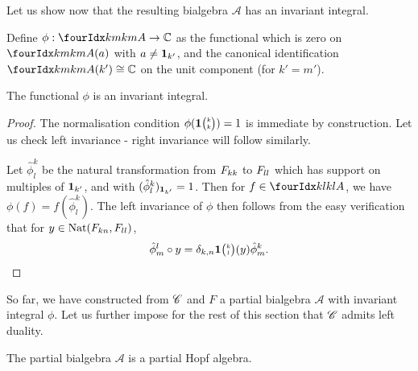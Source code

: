 Let us show now that the resulting bialgebra $\mathscr{A}$ has an invariant integral.

\begin{Def} Define $\phi: \Gr{A}{k}{k}{m}{m} \rightarrow \C$ as the functional which is zero on $\Gr{A}{k}{k}{m}{m}(a)$ with $a\neq \mathbf{1}_{k'}$, and the canonical identification $\Gr{A}{k}{k}{m}{m}(k')\cong \C$ on the unit component (for $k'=m'$).
\end{Def}

\begin{Lem} The functional $\phi$ is an invariant integral.
\end{Lem}

\begin{proof} The normalisation condition $\phi(\mathbf{1}{\tiny {\begin{pmatrix} k\\k\end{pmatrix}}})=1$ is immediate by construction. Let us check left invariance - right invariance will follow similarly.

Let $\hat{\phi}^k_l$ be the natural transformation from $F_{kk}$ to $F_{ll}$ which has support on multiples of $\mathbf{1}_{k'}$, and with $(\hat{\phi}^k_l)_{\mathbf{1}_{k'}} = 1$.  Then for $f\in \Gr{A}{k}{k}{l}{l}$, we have $\phi(f) = f(\hat{\phi}^k_l)$. The left invariance of $\phi$ then follows from the easy verification that for $y\in \operatorname{\mathrm{Nat}}(F_{kn},F_{ll})$, \[\hat{\phi}^l_m\circ y =\delta_{k,n} \mathbf{1}{\tiny {\begin{pmatrix} k\\l\end{pmatrix}}}(y)\hat{\phi}^k_m.\] %
\end{proof}

So far, we have constructed from $\mathscr{C}$ and $F$ a partial bialgebra $\mathscr{A}$ with invariant integral $\phi$. Let us further impose for the rest of this section that $\mathscr{C}$ admits left duality.

\begin{Prop} The partial bialgebra $\mathscr{A}$ is a partial Hopf algebra.
\end{Prop} 

